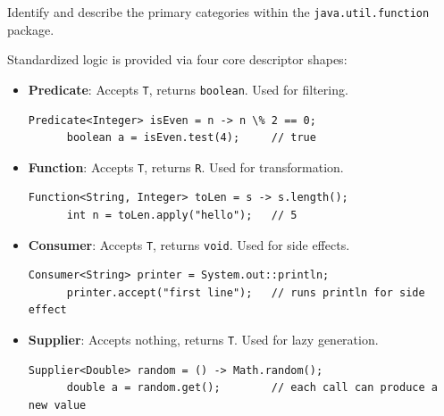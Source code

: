 \newpage

\question[6]
Identify and describe the primary categories within the \texttt{java.util.function} package.
\begin{solutionorbox}[1.00in]
  Standardized logic is provided via four core descriptor shapes:
  \begin{itemize}
    \item \textbf{Predicate}: Accepts \texttt{T}, returns \texttt{boolean}. Used for filtering.
      \begin{lstlisting}[style=java]
      Predicate<Integer> isEven = n -> n \% 2 == 0;
      boolean a = isEven.test(4);     // true
      \end{lstlisting}
    \item \textbf{Function}: Accepts \texttt{T}, returns \texttt{R}. Used for transformation.
      \begin{lstlisting}[style=java]
      Function<String, Integer> toLen = s -> s.length();
      int n = toLen.apply("hello");   // 5
      \end{lstlisting}
    \item \textbf{Consumer}: Accepts \texttt{T}, returns \texttt{void}. Used for side effects.
      \begin{lstlisting}[style=java]
      Consumer<String> printer = System.out::println;
      printer.accept("first line");   // runs println for side effect
      \end{lstlisting}
    \item \textbf{Supplier}: Accepts nothing, returns \texttt{T}. Used for lazy generation.
      \begin{lstlisting}[style=java]
      Supplier<Double> random = () -> Math.random();
      double a = random.get();        // each call can produce a new value
      \end{lstlisting}
  \end{itemize}
\end{solutionorbox}


